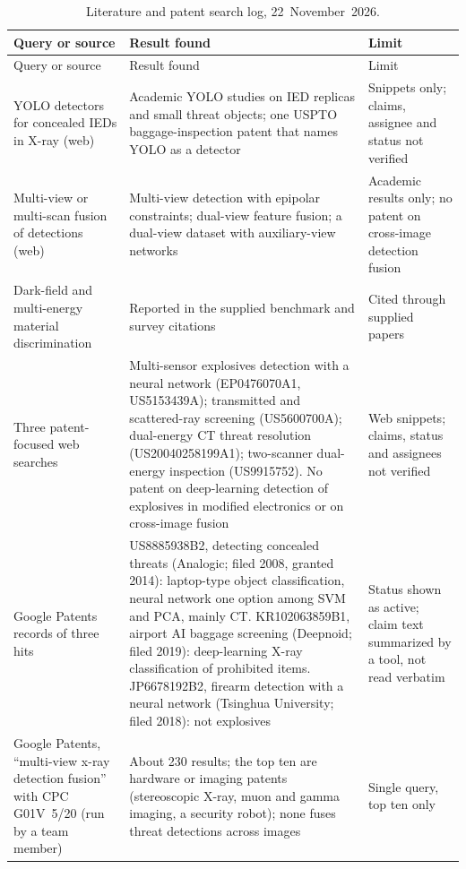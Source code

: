 \begingroup\tablesetup
\begin{longtable}{@{}L{0.24\textwidth}L{0.44\textwidth}L{0.26\textwidth}@{}}
\caption{Literature and patent search log, 22~November~2026.}\label{tab:patentlog}\\
\toprule Query or source & Result found & Limit\\\midrule\endfirsthead
\toprule Query or source & Result found & Limit\\\midrule\endhead
YOLO detectors for concealed IEDs in X-ray (web) & Academic YOLO studies on IED
replicas and small threat objects; one USPTO baggage-inspection patent that names
YOLO as a detector & Snippets only; claims, assignee and status not verified\\
Multi-view or multi-scan fusion of detections (web) & Multi-view detection with
epipolar constraints; dual-view feature fusion; a dual-view dataset with
auxiliary-view networks & Academic results only; no patent on cross-image
detection fusion\\
Dark-field and multi-energy material discrimination & Reported in the supplied
benchmark and survey citations & Cited through supplied papers\\
Three patent-focused web searches & Multi-sensor explosives detection with a
neural network (EP0476070A1, US5153439A); transmitted and scattered-ray screening
(US5600700A); dual-energy CT threat resolution (US20040258199A1); two-scanner
dual-energy inspection (US9915752). No patent on deep-learning detection of
explosives in modified electronics or on cross-image fusion & Web snippets;
claims, status and assignees not verified\\
Google Patents records of three hits & US8885938B2, detecting concealed threats
(Analogic; filed 2008, granted 2014): laptop-type object classification, neural
network one option among SVM and PCA, mainly CT. KR102063859B1, airport AI baggage
screening (Deepnoid; filed 2019): deep-learning X-ray classification of prohibited
items. JP6678192B2, firearm detection with a neural network (Tsinghua University;
filed 2018): not explosives & Status shown as active; claim text summarized by a
tool, not read verbatim\\
Google Patents, ``multi-view x-ray detection fusion'' with CPC G01V~5/20 (run by a
team member) & About 230 results; the top ten are hardware or imaging patents
(stereoscopic X-ray, muon and gamma imaging, a security robot); none fuses threat
detections across images & Single query, top ten only\\

\end{longtable}
